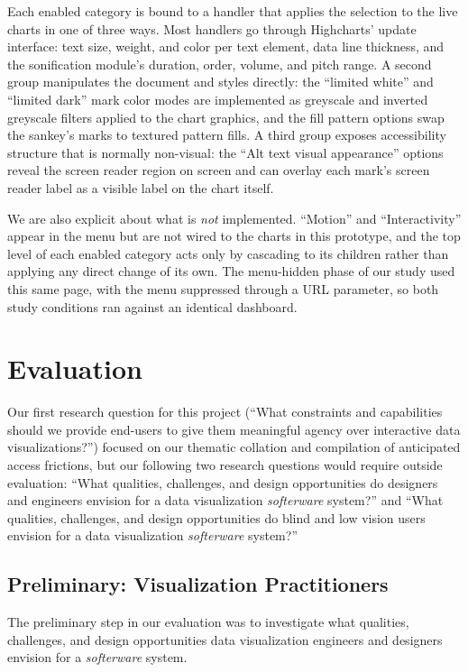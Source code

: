 \documentclass[12pt]{cmuthesis}
\begin{document}
Each enabled category is bound to a handler that applies the selection to the live charts in one of three ways. Most handlers go through Highcharts' update interface: text size, weight, and color per text element, data line thickness, and the sonification module's duration, order, volume, and pitch range. A second group manipulates the document and styles directly: the ``limited white'' and ``limited dark'' mark color modes are implemented as greyscale and inverted greyscale filters applied to the chart graphics, and the fill pattern options swap the sankey's marks to textured pattern fills. A third group exposes accessibility structure that is normally non-visual: the ``Alt text visual appearance'' options reveal the screen reader region on screen and can overlay each mark's screen reader label as a visible label on the chart itself.

We are also explicit about what is \textit{not} implemented. ``Motion'' and ``Interactivity'' appear in the menu but are not wired to the charts in this prototype, and the top level of each enabled category acts only by cascading to its children rather than applying any direct change of its own. The menu-hidden phase of our study used this same page, with the menu suppressed through a URL parameter, so both study conditions ran against an identical dashboard.

\section{Evaluation}
Our first research question for this project (``What constraints and capabilities should we provide end-users to give them meaningful agency over interactive data visualizations?'') focused on our thematic collation and compilation of anticipated access frictions, but our following two research questions would require outside evaluation: ``What qualities, challenges, and design opportunities do designers and engineers envision for a data visualization \textit{softerware} system?'' and ``What qualities, challenges, and design opportunities do blind and low vision users envision for a data visualization \textit{softerware} system?''

\subsection{Preliminary: Visualization Practitioners}
The preliminary step in our evaluation was to investigate what qualities, challenges, and design opportunities data visualization engineers and designers envision for a \textit{softerware} system.
\end{document}

